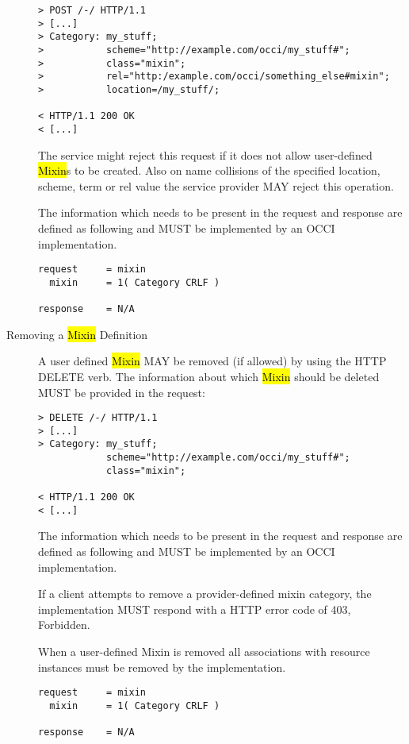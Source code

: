 \documentclass[10pt,a4paper]{article}
\begin{document}
\begin{description}
\begin{verbatim}
> POST /-/ HTTP/1.1
> [...]
> Category: my_stuff;
>           scheme="http://example.com/occi/my_stuff#";
>           class="mixin";
>           rel="http:/example.com/occi/something_else#mixin";
>           location=/my_stuff/;

< HTTP/1.1 200 OK
< [...]
\end{verbatim}

    The service might reject this request if it does not allow
    user-defined \hl{Mixin}s to be created. Also on name collisions of
    the specified location, scheme, term or rel value the service
    provider MAY reject this operation.

    The information which needs to be present in the request and
    response are defined as following and MUST be implemented by an
    OCCI implementation.

\begin{verbatim}
request     = mixin
  mixin     = 1( Category CRLF )

response    = N/A
\end{verbatim}

  \item[Removing a \hl{Mixin} Definition] A user defined \hl{Mixin}
    MAY be removed (if allowed) by using the HTTP DELETE verb. The
    information about which \hl{Mixin} should be deleted MUST be
    provided in the request:
    
\begin{verbatim}
> DELETE /-/ HTTP/1.1
> [...]
> Category: my_stuff; 
            scheme="http://example.com/occi/my_stuff#"; 
            class="mixin";

< HTTP/1.1 200 OK
< [...]
\end{verbatim}

    The information which needs to be present in the request and
    response are defined as following and MUST be implemented by an
    OCCI implementation.
    
    If a client attempts to remove a provider-defined mixin category, the implementation
    MUST respond with a HTTP error code of 403, Forbidden.
    
    When a user-defined Mixin is removed all associations with resource instances
    must be removed by the implementation.

\begin{verbatim}
request     = mixin
  mixin     = 1( Category CRLF )

response    = N/A
\end{verbatim}

\end{description}
\end{document}
